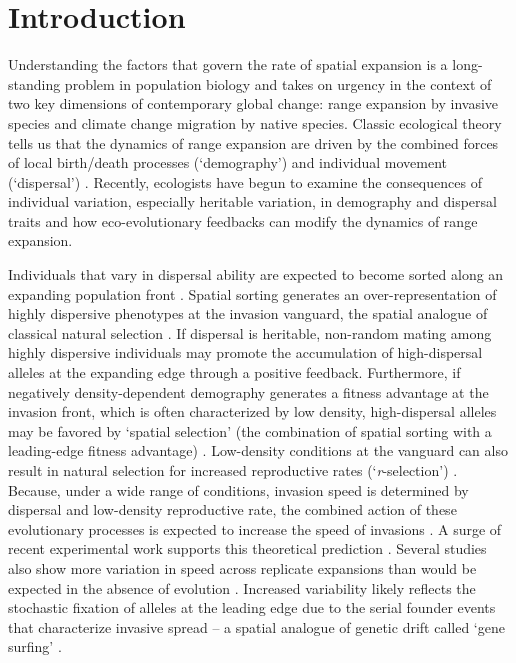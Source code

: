 \documentclass[11pt]{article}
\begin{document}
\section*{Introduction}
Understanding the factors that govern the rate of spatial expansion is a long-standing problem in population biology and takes on urgency in the context of two key dimensions of contemporary global change: range expansion by invasive species and climate change migration by native species.
Classic ecological theory tells us that the dynamics of range expansion are driven by the combined forces of local birth/death processes (`demography') and individual movement (`dispersal') \citep{skellam_random_1951,okubo_diffusion_1980,kot_discrete-time_1986,kot_dispersal_1996}.
Recently, ecologists have begun to examine the consequences of individual variation, especially heritable variation, in demography and dispersal traits and how eco-evolutionary feedbacks can modify the dynamics of range expansion.

Individuals that vary in dispersal ability are expected to become sorted along an expanding population front \citep{shine_evolutionary_2011}.
Spatial sorting generates an over-representation of highly dispersive phenotypes at the invasion vanguard, the spatial analogue of classical natural selection \citep{phillips2018spatial}.
If dispersal is heritable, non-random mating among highly dispersive individuals may promote the accumulation of high-dispersal alleles at the expanding edge through a positive feedback.
Furthermore, if negatively density-dependent demography generates a fitness advantage at the invasion front, which is often characterized by low density, high-dispersal alleles may be favored by `spatial selection' (the combination of spatial sorting with a leading-edge fitness advantage) \citep{phillips_life-history_2010, perkins_evolution_2013}.
Low-density conditions at the vanguard can also result in natural selection for increased reproductive rates (`\textit{r}-selection’) \citep{phillips_life-history_2010}.
Because, under a wide range of conditions, invasion speed is determined by dispersal and low-density reproductive rate, the combined action of these evolutionary processes is expected to increase the speed of invasions \citep{phillips_evolutionary_2015}. A surge of recent experimental work supports this theoretical prediction \citep{williams_rapid_2016, ochocki_rapid_2017, weiss-lehman_rapid_2017,van2018kin}.
Several studies also show more variation in speed across replicate expansions than would be expected in the absence of evolution \citep{phillips_evolutionary_2015, ochocki_rapid_2017, weiss-lehman_rapid_2017,williams2019evolution}.
Increased variability likely reflects the stochastic fixation of alleles at the leading edge due to the serial founder events that characterize invasive spread -- a spatial analogue of genetic drift called `gene surfing' \citep{edmonds_mutations_2004,klopfstein_fate_2006,excoffier_surfing_2008,peischl_expansion_2015,phillips_evolutionary_2015, weiss2019stochastic}.
\end{document}
